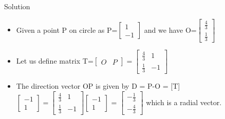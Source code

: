 \documentclass[12pt]{beamer}
\begin{document}
\begin{frame}{Solution}
\begin{itemize}
\item Given a point P on circle as P=$[\begin{array}{c}
1 \\ 
-1
\end{array}]$ and we have O=$[\begin{array}{c}
\frac{4}{3} \\ 
\frac{1}{3}
\end{array}]$
\item Let us define matrix T=$[\begin{array}{cc}
O & P
\end{array}] = [\begin{matrix}
\frac{4}{3} & 1 \\ 
\frac{1}{3} & -1
\end{matrix}]$
\item The direction vector OP is given by D = P-O = [T]$[\begin{array}{c}
-1 \\ 
1
\end{array}] = [\begin{matrix}
\frac{4}{3} & 1 \\ 
\frac{1}{3} & -1
\end{matrix}][\begin{array}{c}
-1 \\ 
1
\end{array}]$ = $[\begin{array}{c}
-\frac{1}{3} \\ 
-\frac{4}{3}
\end{array}]$ which is a radial vector.

 
\end{itemize}

\end{frame}
\end{document}
